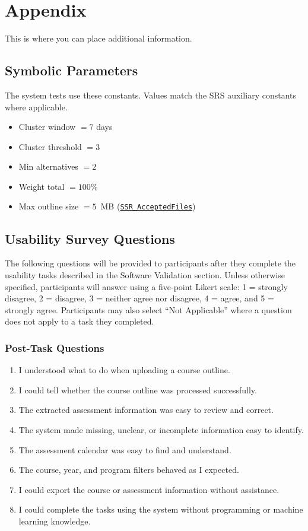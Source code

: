 \documentclass[12pt, titlepage]{article}
\newcommand{\halink}[1]{\href{https://github.com/shivyam/cas-course-optimization/blob/main/pdfs/HazardAnalysis/HazardAnalysis.pdf}{#1}}
\begin{document}
\section{Appendix}

This is where you can place additional information.

\subsection{Symbolic Parameters}

The system tests use these constants. Values match the SRS auxiliary constants where applicable.

\begin{itemize}
\item Cluster window $= 7$ days
\item Cluster threshold $= 3$
\item Min alternatives $= 2$
\item Weight total $= 100\%$
\item Max outline size $= 5$~MB (\halink{\texttt{SSR\_AcceptedFiles}})
\end{itemize}

\subsection{Usability Survey Questions}

The following questions will be provided to participants after they complete
the usability tasks described in the Software Validation section. Unless
otherwise specified, participants will answer using a five-point Likert scale:
1 = strongly disagree, 2 = disagree, 3 = neither agree nor disagree,
4 = agree, and 5 = strongly agree. Participants may also select ``Not
Applicable'' where a question does not apply to a task they completed.

\subsubsection*{Post-Task Questions}

\begin{enumerate}
    \item I understood what to do when uploading a course outline.
    \item I could tell whether the course outline was processed successfully.
    \item The extracted assessment information was easy to review and correct.
    \item The system made missing, unclear, or incomplete information easy to
    identify.
    \item The assessment calendar was easy to find and understand.
    \item The course, year, and program filters behaved as I expected.
    \item I could export the course or assessment information without
    assistance.
    \item I could complete the tasks using the system without programming or
    machine learning knowledge.
\end{enumerate}
\end{document}

